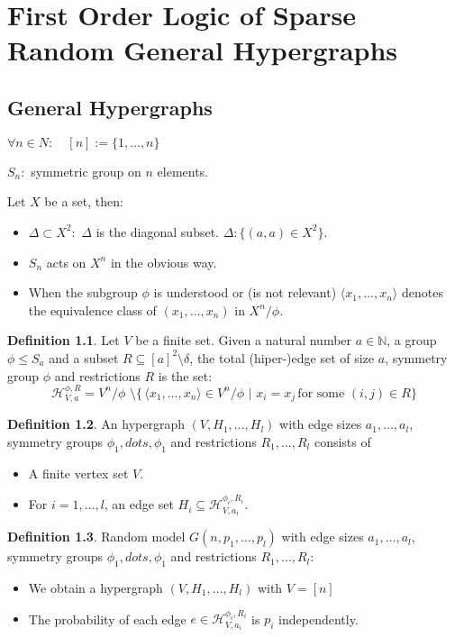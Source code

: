 \documentclass[11pt,notitlepage]{report}
\theoremstyle{definition}
\newtheorem{definition}{Definition}[chapter]
\newcommand{\N}{\mathbb{N}}
\newcommand{\vlst}[2]{#1_1,\dots, #1_{#2}}
\begin{document}
\chapter{First Order Logic of Sparse Random General Hypergraphs}

\section{General Hypergraphs}

$\forall n\in N: \quad [n]:= \{1,\dots, n\}$\par
$S_n:$ symmetric group on $n$ elements. \par
Let $X$ be a set, then:
\begin{itemize}
	\item $\Delta\subset X^2:$ $\Delta$ is the diagonal subset. $\Delta: \{(a,a)\in X^2 \}$.
	\item $S_n$ acts on $X^n$ in the obvious way. 
	\item When the subgroup $\phi$ is understood or (is not relevant) $\langle x_1,\dots,x_n\rangle$
	denotes the equivalence class of $(\vlst{x}{n})$ in $X^n/\phi$.
\end{itemize}
\par


\begin{definition}
	Let $V$ be a finite set. Given a natural number $a\in \N$, a group $\phi\leq S_a$ and a subset
	$R\subseteq [a]^2 \setminus \delta$, the total (hiper-)edge set of size $a$, symmetry group $\phi$ and
	restrictions $R$ is the set:
	\[ \mathcal{H}_{V,a}^{\phi,R}= V^n/\phi \, \, \setminus \{\,  \langle 
	x_1, \dots,x_n\rangle
	 \in V^n/\phi  \, \, | \, \, x_i=x_j \, \text{for some } (i,j)\in R \} \]
	
\end{definition}

\begin{definition}
	An hypergraph $(V,H_1,\dots, H_l)$ with edge sizes $a_1,\dots,a_l$, 
	symmetry groups $\phi_1,dots,\phi_1$ and restrictions $R_1,\dots,R_l$ consists of
	\begin{itemize}
		\item A finite vertex set $V$.
		\item For $i=1,\dots,l$, an edge set $H_i\subseteq \mathcal{H}_{V,a_i}^{\phi_i,R_i}$.
	\end{itemize}
\end{definition}

\begin{definition} 
	Random model $G(n, p_1,\dots, p_l)$ with edge sizes $a_1,\dots,a_l$, 
	symmetry groups $\phi_1,dots,\phi_1$ and restrictions $R_1,\dots,R_l$:
	\begin{itemize}
		\item We obtain a hypergraph $(V,H_1,\dots, H_l)$ with $V=[n]$
		\item The probability of each edge $e\in \mathcal{H}_{V,a_i}^{\phi_i,R_i}$
		is $p_i$ independently. 
	\end{itemize}
\end{definition}
\end{document}
